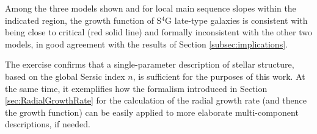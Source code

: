 \documentclass[fleqn,usenatbib]{mnras}
\begin{document}
Among the three models shown and for local main sequence slopes within the indicated region, the growth function of S$^4$G late-type galaxies is consistent with being close to critical (red solid line) and formally inconsistent with the other two models, in good agreement with the results of Section \ref{subsec:implications}.

The exercise confirms that a single-parameter description of stellar structure, based on the global Sersic index $n$, is sufficient for the purposes of this work. At the same time, it exemplifies how the formalism introduced in Section \ref{sec:RadialGrowthRate} for the calculation of the radial growth rate (and thence the growth function) can be easily applied to more elaborate multi-component descriptions, if needed.


\bsp	%
\label{lastpage}
\end{document}

